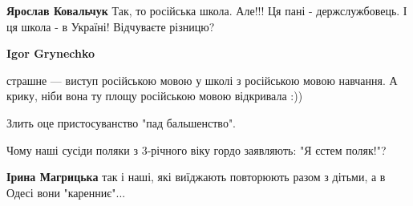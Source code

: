 \begin{itemize}
\begin{itemize}
 
\textbf{Ярослав Ковальчук} Так, то російська школа. Але!!! Ця пані - держслужбовець. І ця школа - в Україні! Відчуваєте різницю?

 
\textbf{Igor Grynechko} 

страшне — виступ російською мовою у школі з російською мовою навчання. А крику,
ніби вона ту площу російською мовою відкривала :))

\end{itemize}

 
Злить оце пристосуванство "пад бальшенство".

 

Чому наші сусіди поляки з 3-річного віку гордо заявляють: "Я єстем поляк!"?

\begin{itemize}
 
\textbf{Ірина Магрицька} так і наші, які виїджають повторюють разом з дітьми, а в Одесі вони "каренниє"...
\end{itemize}

 


\end{itemize}
